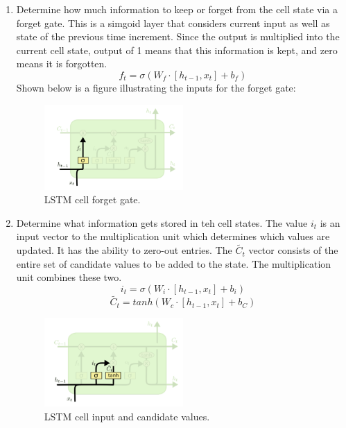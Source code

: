 \begin{enumerate}
	\item Determine how much information to keep or forget from the cell state via a forget gate. This is a simgoid layer that considers current input as well as state of the previous time increment. Since the output is multiplied into the current cell state, output of 1 means that this information is kept, and zero means it is forgotten.
	\begin{equation}
	f_{t} = \sigma(W_{f}\cdot[h_{t-1}, x_{t}] + b_{f})
	\end{equation}
	Shown below is a figure illustrating the inputs for the forget gate:
	\begin{figure}[H]
		\includegraphics[width=0.5\textwidth]{images/LSTM_forget.png}
		\caption{LSTM cell forget gate.}
	\end{figure}

	\item Determine what information gets stored in teh cell states. The value ${i_{t}}$ is an input vector to the multiplication unit which determines which values are updated. It has the ability to zero-out entries. The $\tilde{C_{t}}$ vector consists of the entire set of candidate values to be added to the state. The multiplication unit combines these two.
	\begin{equation}
	i_{t} = \sigma(W_{i}\cdot[h_{t-1}, x_{t}] + b_{i})
	\end{equation}
	\begin{equation}
	\tilde{C_{t}} = tanh(W_{c}\cdot[h_{t-1}, x_{t}] + b_{C})
	\end{equation}
	\begin{figure}[H]
		\includegraphics[width=0.5\textwidth]{images/LSTM_cell_input.png}
		\caption{LSTM cell input and candidate values.}
	\end{figure}


\end{enumerate}
